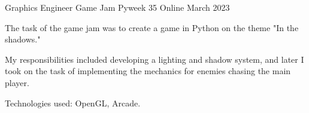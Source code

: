 

\begin{cventries}

\cventry
{Graphics Engineer} %
{Game Jam Pyweek 35} %
{Online} %
{March 2023} %
{
  \begin{cvitems} %
    \item {The task of the game jam was to create a game in Python on the theme "In the shadows."}
    \item {My responsibilities included developing a lighting and shadow system, and later I took on the task of implementing the mechanics for enemies chasing the main player.}
    \item {Technologies used: OpenGL, Arcade.}
  \end{cvitems}
}


\end{cventries}
